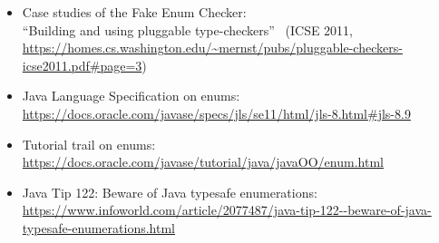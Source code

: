
\begin{itemize}
\item Case studies of the Fake Enum Checker:\\
  ``Building and using pluggable type-checkers''~\cite{DietlDEMS2011}
  (ICSE 2011, \url{https://homes.cs.washington.edu/~mernst/pubs/pluggable-checkers-icse2011.pdf#page=3})

\item Java Language Specification on enums:\\
  \url{https://docs.oracle.com/javase/specs/jls/se11/html/jls-8.html#jls-8.9}

\item Tutorial trail on enums:\\
  \url{https://docs.oracle.com/javase/tutorial/java/javaOO/enum.html}

\item Java Tip 122: Beware of Java typesafe enumerations:\\
  \url{https://www.infoworld.com/article/2077487/java-tip-122--beware-of-java-typesafe-enumerations.html}

\end{itemize}

